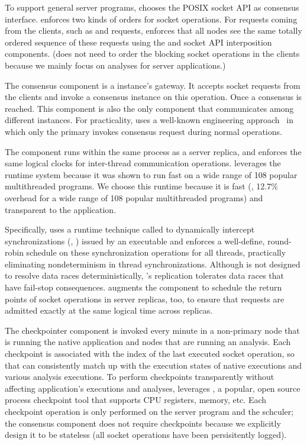 To support general server programs, \xxx chooses the POSIX socket API as
consensus interface. \xxx enforces two kinds of orders for socket
operations.  For requests coming from the clients, such as \connect and
\send requests, \xxx enforces that all nodes see the same totally ordered
sequence of these requests using the \paxos and socket API interposition
components.  (\xxx does not need to order the blocking socket operations
in the clients because we mainly focus on analyses for server applications.)


The \paxos consensus component is a \xxx instance's gateway.  It accepts socket
requests from the clients and invoke a \paxos consensus instance on this 
operation. Once a consensus is reached. This component is also the only \xxx 
component that communicates among different \xxx instances. For practicality, 
\xxx uses a well-known \paxos engineering approach~\cite{paxos:practical} in 
which only the primary invokes consensus request during normal operations.

The \dmt component runs within the same process as a server replica, and
enforces the same logical clocks for inter-thread communication
operations. \xxx leverages the \parrot~\cite{parrot:sosp13} \dmt runtime
system because it was shown to run fast on a wide range of 108 popular
multithreaded programs. We choose this \dmt runtime because it is fast (\ie, 
12.7\% overhead for a wide range of 108 popular multithreaded programs) and 
transparent to the application.

Specifically, \parrot uses a runtime technique called \ldpreload to dynamically 
intercept \pthread synchronizations (\eg, \mutexlock) issued by an executable 
and enforces a well-define, round-robin schedule on these synchronization 
operations for all threads, practically eliminating nondeterminism in thread
synchronizations. Although \parrot is not designed to resolve data races
deterministically, \xxx's replication tolerates data races that have
fail-stop consequences.  \xxx augments the \dmt component to schedule the
return points of socket operations in server replicas, too, to ensure that
requests are admitted exactly at the same logical time across replicas.

The checkpointer component is invoked every minute in a non-primary node that 
is running the native application and nodes that are running an analysis. Each 
checkpoint is associated with the index of the last executed socket operation, 
so that \xxx can consistently match up with the execution states of native 
executions and various analysis executions. To perform checkpoints 
transparently without affecting application's executions and analyses, \xxx 
leverages \criu, a popular, open source process checkpoint tool that supports 
CPU registers, memory, etc. Each checkpoint operation is only performed on the 
server program and the \dmt schculer; the \paxos consensus component does not 
require checkpoints because we explicitly design it to be stateless (all socket 
operations have been persisitently logged).

